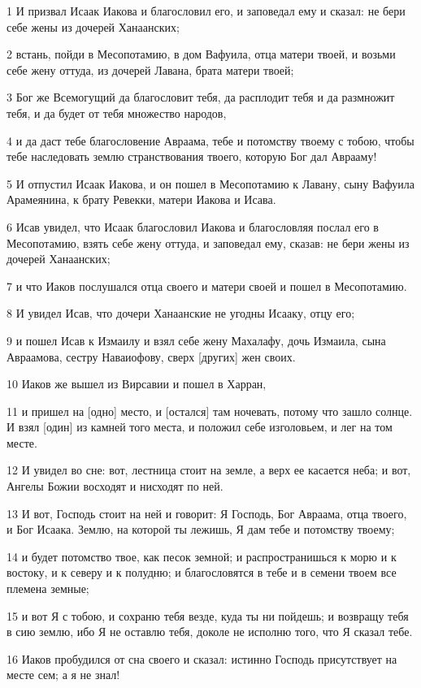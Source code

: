 \par 1 И призвал Исаак Иакова и благословил его, и заповедал ему и сказал: не бери себе жены из дочерей Ханаанских;
\par 2 встань, пойди в Месопотамию, в дом Вафуила, отца матери твоей, и возьми себе жену оттуда, из дочерей Лавана, брата матери твоей;
\par 3 Бог же Всемогущий да благословит тебя, да расплодит тебя и да размножит тебя, и да будет от тебя множество народов,
\par 4 и да даст тебе благословение Авраама, тебе и потомству твоему с тобою, чтобы тебе наследовать землю странствования твоего, которую Бог дал Аврааму!
\par 5 И отпустил Исаак Иакова, и он пошел в Месопотамию к Лавану, сыну Вафуила Арамеянина, к брату Ревекки, матери Иакова и Исава.
\par 6 Исав увидел, что Исаак благословил Иакова и благословляя послал его в Месопотамию, взять себе жену оттуда, и заповедал ему, сказав: не бери жены из дочерей Ханаанских;
\par 7 и что Иаков послушался отца своего и матери своей и пошел в Месопотамию.
\par 8 И увидел Исав, что дочери Ханаанские не угодны Исааку, отцу его;
\par 9 и пошел Исав к Измаилу и взял себе жену Махалафу, дочь Измаила, сына Авраамова, сестру Наваиофову, сверх [других] жен своих.
\par 10 Иаков же вышел из Вирсавии и пошел в Харран,
\par 11 и пришел на [одно] место, и [остался] там ночевать, потому что зашло солнце. И взял [один] из камней того места, и положил себе изголовьем, и лег на том месте.
\par 12 И увидел во сне: вот, лестница стоит на земле, а верх ее касается неба; и вот, Ангелы Божии восходят и нисходят по ней.
\par 13 И вот, Господь стоит на ней и говорит: Я Господь, Бог Авраама, отца твоего, и Бог Исаака. Землю, на которой ты лежишь, Я дам тебе и потомству твоему;
\par 14 и будет потомство твое, как песок земной; и распространишься к морю и к востоку, и к северу и к полудню; и благословятся в тебе и в семени твоем все племена земные;
\par 15 и вот Я с тобою, и сохраню тебя везде, куда ты ни пойдешь; и возвращу тебя в сию землю, ибо Я не оставлю тебя, доколе не исполню того, что Я сказал тебе.
\par 16 Иаков пробудился от сна своего и сказал: истинно Господь присутствует на месте сем; а я не знал!
